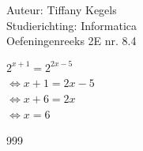\documentclass[a4paper]{article}
\begin{document}
  
\noindent \large Auteur: Tiffany Kegels \\
\noindent \large Studierichting: Informatica\\
\noindent \large Oefeningenreeks 2E nr. 8.4\\

\medskip

\normalsize
$2^{x+1} = 2^{2x-5}$\\

$\Leftrightarrow x + 1 = 2x - 5$\\

$\Leftrightarrow x + 6 = 2x$\\

$\Leftrightarrow x = 6$\\

\begin{thebibliography}{999}
\end{thebibliography}
\end{document}
